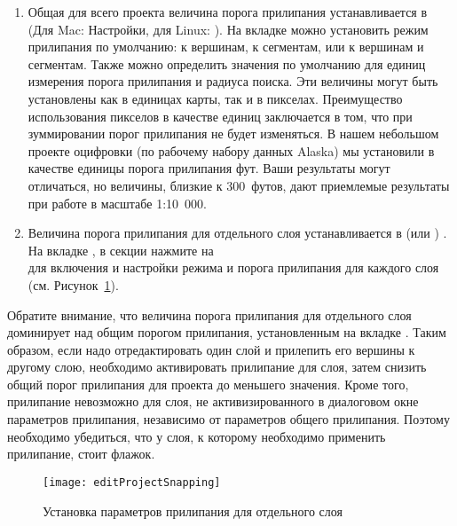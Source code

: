 \begin{enumerate}
\item Общая для всего проекта величина порога прилипания устанавливается в
 \arrow {}
(Для Mac: \mainmenuopt{\qg} \arrow Настройки, для Linux: 
\arrow {}).
На вкладке  можно установить режим прилипания по
умолчанию: к вершинам, к сегментам, или к вершинам и сегментам. Также можно определить
значения по умолчанию для единиц измерения порога прилипания и радиуса поиска.
Эти величины  могут быть установлены как в единицах карты, так и в пикселах.
Преимущество использования пикселов в качестве единиц заключается в том, что
при зуммировании порог прилипания не будет изменяться.
В нашем небольшом проекте оцифровки (по рабочему набору данных Alaska) мы
установили в качестве единицы порога прилипания фут. Ваши результаты могут
отличаться, но величины, близкие к 300~футов, дают приемлемые
результаты при работе в масштабе 1:10~000.
\item Величина порога прилипания для отдельного слоя устанавливается в
 (или ) \arrow
{}. На вкладке ,
в секции  нажмите на \\
 для
включения и настройки режима и порога прилипания для каждого слоя (см.
Рисунок~\ref{fig:snappingoptions}).
\end{enumerate}
Обратите внимание, что величина порога прилипания для отдельного слоя
доминирует над общим порогом прилипания, установленным на вкладке .
Таким образом, если надо отредактировать один слой и прилепить его вершины
к другому слою, необходимо активировать прилипание 
для слоя, затем снизить общий порог прилипания для проекта до меньшего
значения. Кроме того, прилипание невозможно для слоя, не активизированного
в диалоговом окне параметров прилипания, независимо от параметров
общего прилипания. Поэтому необходимо убедиться, что у слоя, к которому
необходимо применить прилипание, стоит флажок.

\begin{figure}[ht]
   \centering
   \texttt{[image: editProjectSnapping]}
   \caption{Установка параметров прилипания для отдельного слоя \wincaption}\label{fig:snappingoptions}
\end{figure}


